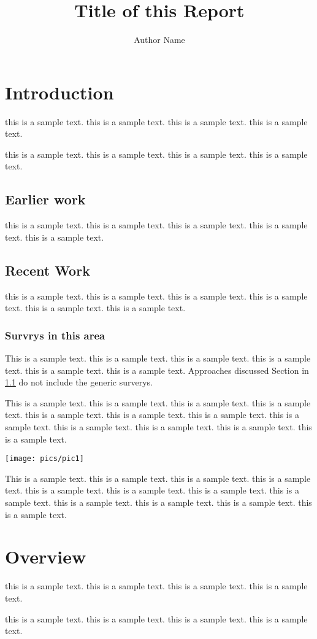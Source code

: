 \documentclass{article}
\title{Title of this Report}
\author {Author Name}
\begin{document}
\maketitle

\section{Introduction}

this is  a sample text.  this is  a sample text.  this is  a sample text.  this is  a sample text.  






this is  a sample text.
this is  a sample text.
this is  a sample text.
this is  a sample text.

\subsection{Earlier work} \label{ew}

this is  a sample text.
this is  a sample text.
this is  a sample text.
this is  a sample text.
this is  a sample text.

\subsection{Recent Work}

this is  a sample text.
this is  a sample text.
this is  a sample text.
this is  a sample text.
this is  a sample text.
this is  a sample text.

\subsubsection{Survrys in this area}

This is  a sample text.
this is  a sample text.
this is  a sample text.
this is  a sample text.
this is  a sample text.
this is  a sample text.
Approaches discussed Section in \ref{ew} do not include
the generic surverys.

This is  a sample text.
this is  a sample text.
this is  a sample text.
this is  a sample text.
this is  a sample text.
this is  a sample text.
this is  a sample text.
this is  a sample text.
this is  a sample text.
this is  a sample text.
this is  a sample text.
this is  a sample text.

\texttt{[image: pics/pic1]}

\vspace{1mm}
\noindent
This is  a sample text.
this is  a sample text.
this is  a sample text.
this is  a sample text.
this is  a sample text.
this is  a sample text.
this is  a sample text.
this is  a sample text.
this is  a sample text.
this is  a sample text.
this is  a sample text.
this is  a sample text.


\section {Overview }

this is  a sample text.
this is  a sample text.
this is  a sample text.
this is  a sample text.

this is  a sample text.
this is  a sample text.
this is  a sample text.
this is  a sample text.
\end{document}
